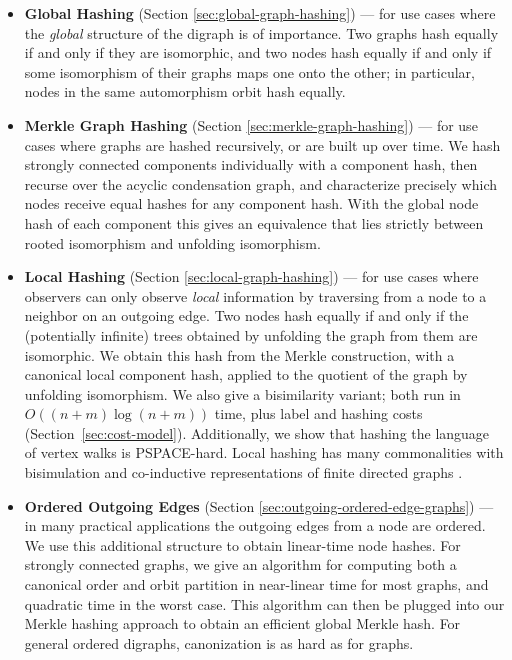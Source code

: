 \documentclass[twoside,leqno]{article}
\begin{document}
\begin{itemize}
  \item \textbf{Global Hashing} (Section \ref{sec:global-graph-hashing}) --- for use cases where the \textit{global} structure of the digraph is of importance. Two graphs hash equally if and only if they are isomorphic, and two nodes hash equally if and only if some isomorphism of their graphs maps one onto the other; in particular, nodes in the same automorphism orbit hash equally.
  \item \textbf{Merkle Graph Hashing} (Section \ref{sec:merkle-graph-hashing}) --- for use cases where graphs are hashed recursively, or are built up over time. We hash strongly connected components individually with a component hash, then recurse over the acyclic condensation graph, and characterize precisely which nodes receive equal hashes for any component hash. With the global node hash of each component this gives an equivalence that lies strictly between rooted isomorphism and unfolding isomorphism.
  \item \textbf{Local Hashing} (Section \ref{sec:local-graph-hashing}) --- for use cases where observers can only observe \textit{local} information by traversing from a node to a neighbor on an outgoing edge. Two nodes hash equally if and only if the (potentially infinite) trees obtained by unfolding the graph from them are isomorphic. We obtain this hash from the Merkle construction, with a canonical local component hash, applied to the quotient of the graph by unfolding isomorphism. We also give a bisimilarity variant; both run in $O((n+m)\log(n+m))$ time, plus label and hashing costs (Section~\ref{sec:cost-model}). Additionally, we show that hashing the language of vertex walks is PSPACE-hard. Local hashing has many commonalities with bisimulation and co-inductive representations of finite directed graphs \cite{bisimulation_book,coinductive_graphs}.
  \item \textbf{Ordered Outgoing Edges} (Section \ref{sec:outgoing-ordered-edge-graphs}) --- in many practical applications the outgoing edges from a node are ordered. We use this additional structure to obtain linear-time node hashes. For strongly connected graphs, we give an algorithm for computing both a canonical order and orbit partition in near-linear time for most graphs, and quadratic time in the worst case. This algorithm can then be plugged into our Merkle hashing approach to obtain an efficient global Merkle hash. For general ordered digraphs, canonization is as hard as for graphs.
\end{itemize}
\end{document}
